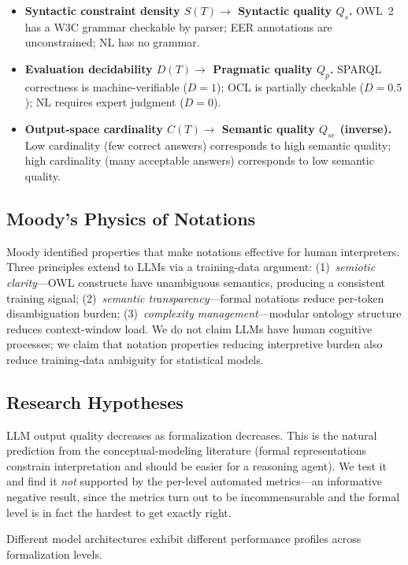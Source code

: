 \documentclass[runningheads]{llncs}
\begin{document}
\begin{itemize}[noitemsep]
  \item \textbf{Syntactic constraint density $S(T) \rightarrow$ Syntactic quality $Q_s$.} OWL~2 has a W3C grammar checkable by parser; EER annotations are unconstrained; NL has no grammar.
  \item \textbf{Evaluation decidability $D(T) \rightarrow$ Pragmatic quality $Q_p$.} SPARQL correctness is machine-verifiable ($D=1$); OCL is partially checkable ($D=0.5$); NL requires expert judgment ($D=0$).
  \item \textbf{Output-space cardinality $C(T) \rightarrow$ Semantic quality $Q_{se}$ (inverse).} Low cardinality (few correct answers) corresponds to high semantic quality; high cardinality (many acceptable answers) corresponds to low semantic quality.
\end{itemize}

\subsection{Moody's Physics of Notations}

Moody \cite{moody2009physics} identified properties that make notations effective for human interpreters. Three principles extend to LLMs via a training-data argument: (1)~\emph{semiotic clarity}---OWL constructs have unambiguous semantics, producing a consistent training signal; (2)~\emph{semantic transparency}---formal notations reduce per-token disambiguation burden; (3)~\emph{complexity management}---modular ontology structure reduces context-window load. We do not claim LLMs have human cognitive processes; we claim that notation properties reducing interpretive burden also reduce training-data ambiguity for statistical models.

\subsection{Research Hypotheses}

\begin{description}[noitemsep,style=nextline]
  \item[H1: Quality gradient.] LLM output quality decreases as formalization decreases. This is the natural prediction from the conceptual-modeling literature (formal representations constrain interpretation and should be easier for a reasoning agent). We test it and find it \emph{not} supported by the per-level automated metrics---an informative negative result, since the metrics turn out to be incommensurable and the formal level is in fact the hardest to get exactly right.
  \item[H2: Model--formalization interaction.] Different model architectures exhibit different performance profiles across formalization levels.
\end{description}
\end{document}
